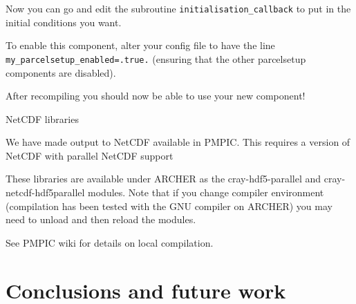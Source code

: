 \documentclass{beamer}
\newenvironment{Shaded}{}{}
\newcommand{\KeywordTok}[1]{\textcolor[rgb]{0.13,0.29,0.53}{\textbf{{#1}}}}
\newcommand{\DataTypeTok}[1]{\textcolor[rgb]{0.13,0.29,0.53}{{#1}}}
\newcommand{\FloatTok}[1]{\textcolor[rgb]{0.00,0.00,0.81}{{#1}}}
\newcommand{\StringTok}[1]{\textcolor[rgb]{0.31,0.60,0.02}{{#1}}}
\newcommand{\OperatorTok}[1]{\textcolor[rgb]{0.81,0.36,0.00}{\textbf{{#1}}}}
\newcommand{\NormalTok}[1]{{#1}}
\begin{document}
\begin{frame}[fragile]

\begin{footnotesize}
\begin{Shaded}
\end{Shaded}
\end{footnotesize}

Now you can go and edit the subroutine \texttt{initialisation\_callback}
to put in the initial conditions you want.

To enable this component, alter your config file to have the line
\texttt{my\_parcelsetup\_enabled=.true.} (ensuring that the other
parcelsetup components are disabled).

After recompiling you should now be able to use your new component!

\end{frame}

\begin{frame}[fragile]{NetCDF libraries}
\protect\hypertarget{netcdf-libraries}{}

We have made output to NetCDF available in PMPIC. This requires a
version of NetCDF with parallel NetCDF support

These libraries are available under ARCHER as the cray-hdf5-parallel and
cray-netcdf-hdf5parallel modules. Note that if you change compiler
environment (compilation has been tested with the GNU compiler on
ARCHER) you may need to unload and then reload the modules.

See PMPIC wiki for details on local compilation.

\end{frame}
 
\section{Conclusions and future work}
\end{document}
